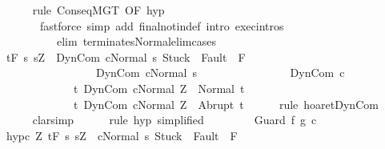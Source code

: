 \begin{isabellebody}
\ \ \ \ \isamarkupfalse%
\ {\isacharparenleft}rule\ ConseqMGT\ {\isacharbrackleft}OF\ hyp{\isacharbrackright}{\isacharparenright}\ \isanewline
\ \ \ \ \ \ \ {\isacharparenleft}fastforce\ simp\ add{\isacharcolon}\ final{\isacharunderscore}notin{\isacharunderscore}def\ intro{\isacharcolon}\ exec{\isachardot}intros\ \isanewline
\ \ \ \ \ \ \ \ \ \ elim{\isacharcolon}\ terminates{\isacharunderscore}Normal{\isacharunderscore}elim{\isacharunderscore}cases{\isacharparenright}\isanewline
\ \ \isamarkupfalse%
\ {\isachardoublequoteopen}{\isasymGamma}{\isacharcomma}{\isasymTheta}{\isasymturnstile}\isactrlsub t\isactrlbsub {\isacharslash}F\ \isactrlesub {\isacharbraceleft}s{\isachardot}\ s{\isacharequal}Z\ {\isasymand}\ {\isasymGamma}{\isasymturnstile}{\isasymlangle}DynCom\ c{\isacharcomma}Normal\ s{\isasymrangle}\ {\isasymRightarrow}{\isasymnotin}{\isacharparenleft}{\isacharbraceleft}Stuck{\isacharbraceright}\ {\isasymunion}\ Fault\ {\isacharbackquote}\ {\isacharparenleft}{\isacharminus}F{\isacharparenright}{\isacharparenright}\ {\isasymand}\ \isanewline
\ \ \ \ \ \ \ \ \ \ \ \ \ \ \ \ \ {\isasymGamma}{\isasymturnstile}DynCom\ c{\isasymdown}Normal\ s{\isacharbraceright}\isanewline
\ \ \ \ \ \ \ \ \ \ \ \ \ \ \ \ DynCom\ c\isanewline
\ \ \ \ \ \ \ \ \ \ \ \ \ {\isacharbraceleft}t{\isachardot}\ {\isasymGamma}{\isasymturnstile}{\isasymlangle}DynCom\ c{\isacharcomma}Normal\ Z{\isasymrangle}\ {\isasymRightarrow}\ Normal\ t{\isacharbraceright}{\isacharcomma}\isanewline
\ \ \ \ \ \ \ \ \ \ \ \ \ {\isacharbraceleft}t{\isachardot}\ {\isasymGamma}{\isasymturnstile}{\isasymlangle}DynCom\ c{\isacharcomma}Normal\ Z{\isasymrangle}\ {\isasymRightarrow}\ Abrupt\ t{\isacharbraceright}{\isachardoublequoteclose}\isanewline
\ \ \ \ \isamarkupfalse%
\ {\isacharparenleft}rule\ hoaret{\isachardot}DynCom{\isacharparenright}\isanewline
\ \ \ \ \isamarkupfalse%
\ {\isacharparenleft}clarsimp{\isacharparenright}\isanewline
\ \ \ \ \isamarkupfalse%
\ {\isacharparenleft}rule\ hyp{\isacharprime}\ {\isacharbrackleft}simplified{\isacharbrackright}{\isacharparenright}\isanewline
\ \ \ \ \isamarkupfalse%
\isanewline
{}\isamarkupfalse%
\isanewline
\ \ \isamarkupfalse%
\ {\isacharparenleft}Guard\ f\ g\ c{\isacharparenright}\isanewline
\ \ \isamarkupfalse%
\ hyp{\isacharunderscore}c{\isacharcolon}\ {\isachardoublequoteopen}{\isasymforall}Z{\isachardot}\ {\isasymGamma}{\isacharcomma}{\isasymTheta}{\isasymturnstile}\isactrlsub t\isactrlbsub {\isacharslash}F\isactrlesub \ {\isacharbraceleft}s{\isachardot}\ s{\isacharequal}Z\ {\isasymand}\ {\isasymGamma}{\isasymturnstile}{\isasymlangle}c{\isacharcomma}Normal\ s{\isasymrangle}\ {\isasymRightarrow}{\isasymnotin}{\isacharparenleft}{\isacharbraceleft}Stuck{\isacharbraceright}\ {\isasymunion}\ Fault\ {\isacharbackquote}\ {\isacharparenleft}{\isacharminus}F{\isacharparenright}{\isacharparenright}\ {\isasymand}\ \isanewline

\end{isabellebody}
